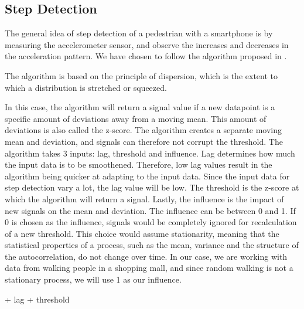 

\subsection{Step Detection}

The general idea of step detection of a pedestrian with a smartphone is by measuring the accelerometer sensor, and observe the increases and decreases in the acceleration pattern\cite{HybridPositioningPaper}. We have chosen to follow the algorithm proposed in \cite{peakdetection}. 

The algorithm is based on the principle of dispersion, which is the extent to which a distribution is stretched or squeezed. %

In this case, the algorithm will return a signal value if a new datapoint is a specific amount of deviations away from a moving mean. This amount of deviations is also called the z-score. The algorithm creates a separate moving mean and deviation, and signals can therefore not corrupt the threshold. The algorithm takes 3 inputs: lag, threshold and influence. Lag determines how much the input data is to be smoothened. Therefore, low lag values result in the algorithm being quicker at adapting to the input data. Since the input data for step detection vary a lot, the lag value will be low. The threshold is the z-score at which the algorithm will return a signal. Lastly, the influence is the impact of new signals on the mean and deviation. The influence can be between 0 and 1. If 0 is chosen as the influence, signals would be completely ignored for recalculation of a new threshold. This choice would assume stationarity, meaning that the statistical properties of a process, such as the mean, variance and the structure of the autocorrelation, do not change over time. In our case, we are working with data from walking people in a shopping mall, and since random walking is not a stationary process, we will use 1 as our influence. 


+ lag 
+ threshold





%

